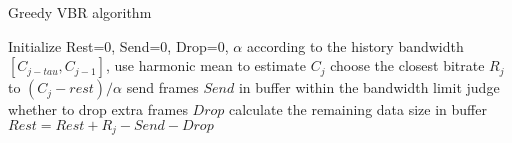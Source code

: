 \begin{algorithm}[h]
\caption{Greedy VBR algorithm}
\label{alg:greedy-vbr}
\begin{algorithmic}[1]
\State Initialize Rest=0, Send=0, Drop=0, $\alpha$
\State according to the history bandwidth $[C_{j-tau},C_{j-1}]$, use harmonic mean to estimate $C_j$
\State choose the closest bitrate $R_j$ to $(C_j-rest)/\alpha$
\State send frames $Send$ in buffer within the bandwidth limit
\State judge whether to drop extra frames $Drop$
\State calculate the remaining data size in buffer $Rest = Rest + R_j - Send - Drop$
\EndFor
\end{algorithmic}
\end{algorithm} 